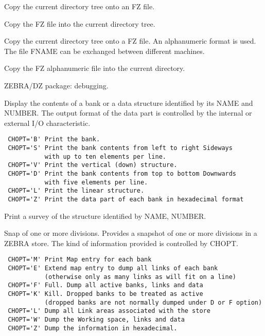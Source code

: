 \BEGARG
{}
\ENDARG
\BEGTEXT
Copy the current directory tree onto an FZ file.
\ENDTEXT

\BEGARG
{}
\ENDARG
\BEGTEXT
Copy the FZ file into the current directory tree.
\ENDTEXT

\BEGARG
{}
\ENDARG
\BEGTEXT
Copy the current directory tree onto a FZ file.
An alphanumeric format is used.
The file FNAME can be exchanged between different machines.
\ENDTEXT

\BEGARG
{}
\ENDARG
\BEGTEXT
Copy the FZ alphanumeric file into the current directory.
\ENDTEXT


\BEGTEXT
ZEBRA/DZ package: debugging.
\ENDTEXT

\BEGARG
{}
\ENDARG
\BEGTEXT
Display the contents of a bank or a data structure
identified by its NAME and NUMBER.
The output format of the data part is controlled by the internal
or external I/O characteristic.
\begin{verbatim}
 CHOPT='B' Print the bank.
 CHOPT='S' Print the bank contents from left to right Sideways
           with up to ten elements per line.
 CHOPT='V' Print the vertical (down) structure.
 CHOPT='D' Print the bank contents from top to bottom Downwards
           with five elements per line.
 CHOPT='L' Print the linear structure.
 CHOPT='Z' Print the data part of each bank in hexadecimal format
\end{verbatim}
\ENDTEXT

\BEGARG
{}
\ENDARG
\BEGTEXT
Print a survey of the structure identified by NAME, NUMBER.
\ENDTEXT

\BEGARG
{}
\ENDARG
\BEGTEXT
Snap of one or more divisions.
Provides a snapshot of one or more divisions in a ZEBRA store.
The kind of information provided is controlled by CHOPT.
\begin{verbatim}
 CHOPT='M' Print Map entry for each bank
 CHOPT='E' Extend map entry to dump all links of each bank
           (otherwise only as many links as will fit on a line)
 CHOPT='F' Full. Dump all active banks, links and data
 CHOPT='K' Kill. Dropped banks to be treated as active
           (dropped banks are not normally dumped under D or F option)
 CHOPT='L' Dump all Link areas associated with the store
 CHOPT='W' Dump the Working space, links and data
 CHOPT='Z' Dump the information in hexadecimal.
\end{verbatim}
\ENDTEXT

